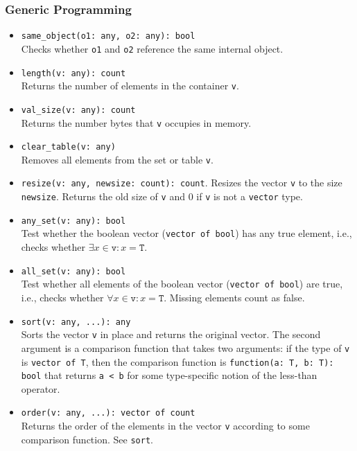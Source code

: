 \documentclass[10pt,landscape]{article}
\begin{document}
\begin{multicols*}{2}
\subsubsection*{Generic Programming}

\begin{itemize}
  \item \verb|same_object(o1: any, o2: any): bool|\\
    Checks whether \texttt{o1} and \texttt{o2} reference the same internal
    object.
  \item \verb|length(v: any): count|\\
    Returns the number of elements in the container \texttt{v}.
  \item \verb|val_size(v: any): count|\\
    Returns the number bytes that \verb|v| occupies in memory.
  \item \verb|clear_table(v: any)|\\
    Removes all elements from the set or table \texttt{v}.
  \item \verb|resize(v: any, newsize: count): count|.
    Resizes the vector \verb|v| to the size \verb|newsize|.
    Returns the old size of \verb|v| and 0 if \verb|v| is not a \verb|vector|
    type.
  \item \verb|any_set(v: any): bool|\\
    Test whether the boolean vector (\verb|vector of bool|) has any true
    element, i.e., checks whether $\exists x \in \mathtt{v}: x = \mathtt{T}$.
  \item \verb|all_set(v: any): bool|\\
    Test whether all elements of the boolean vector (\verb|vector of bool|) are
    true, i.e., checks whether $\forall x \in \mathtt{v}: x = \mathtt{T}$.
    Missing elements count as false.
  \item \verb|sort(v: any, ...): any|\\
    Sorts the vector \verb|v| in place and returns the original vector. 
    The second argument is a comparison function that takes two arguments: if
    the type of \verb|v| is \verb|vector of T|, then the comparison function is
    \verb|function(a: T, b: T): bool| that returns \verb|a < b| for some
    type-specific notion of the less-than operator.
  \item \verb|order(v: any, ...): vector of count|\\
    Returns the order of the elements in the vector \verb|v| according to some
    comparison function. See \verb|sort|.
\end{itemize}


\end{multicols*}
\end{document}

